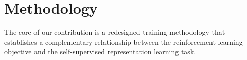 
        
        

\section{Methodology}
The core of our contribution is a redesigned training methodology that establishes a complementary relationship between the reinforcement learning objective and the self-supervised representation learning task.


